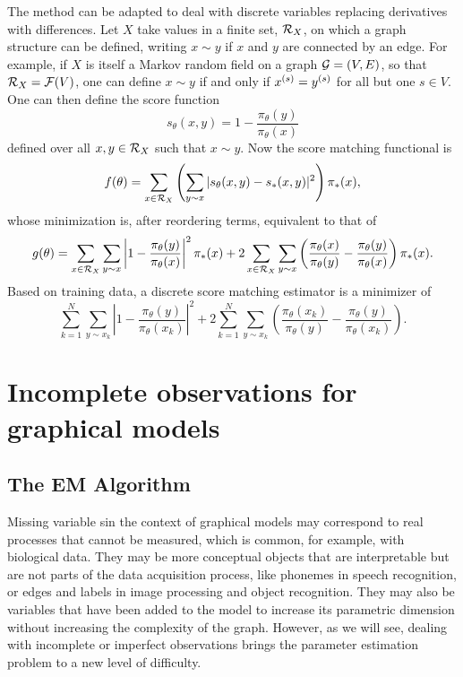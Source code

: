  \begin{remark}
 \label{rem:score.discrete}
The method can be adapted to deal with discrete variables replacing derivatives with differences. Let $X$ take values in a finite set, ${\mathcal R}_X$, on which a graph structure can be defined, writing $x\sim y$ if  $x$ and $y$ are connected by an edge. For example, if $X$ is itself a Markov random field on a graph ${\mathcal G} = (V, E)$, so that ${\mathcal R}_X = {\mathcal F}(V)$, one can define $x\sim y$ if and only if $x^{(s)} = y^{(s)}$ for all but one $s\in V$. One can then define the score function
\[
s_\theta(x, y) = 1 - \frac{\pi_\theta (y)}{\pi_\theta(x)}
\]
defined over all $x, y\in {\mathcal R}_X$ such that $x\sim y$. Now the score matching functional is  
\[
f(\theta) = \sum_{x\in {\mathcal R}_X} \left(\sum_{y\sim x} |s_\theta(x,y) - s_*(x,y)|^2\right) \pi_*(x),
\]
whose minimization is, after reordering terms, equivalent to that of 
\[
g(\theta) = \sum_{x\in {\mathcal R}_X} \sum_{y\sim x} \left| 1 - \frac{\pi_\theta (y)}{\pi_\theta(x)}\right|^2 \pi_*(x) + 2 \sum_{x\in {\mathcal R}_X} \sum_{y\sim x} 
\left( \frac{\pi_\theta(x)}{\pi_\theta(y)} - \frac{\pi_\theta(y)}{\pi_\theta(x)}\right) \pi_*(x).
\]
Based on training data, a discrete score matching estimator is a minimizer of
 \begin{equation}
 \label{eq:scorematch.obj.disc}
\sum_{k=1}^N \sum_{y\sim x_k} \left| 1 - \frac{\pi_\theta (y)}{\pi_\theta(x_k)}\right|^2 + 2 \sum_{k=1}^N \sum_{y\sim x_k} 
\left( \frac{\pi_\theta(x_k)}{\pi_\theta(y)} - \frac{\pi_\theta(y)}{\pi_\theta(x_k)}\right).
\end{equation}

 \end{remark}
 
 






\section{Incomplete observations for graphical models}
\subsection{The EM Algorithm}

 Missing variable sin the context of graphical models may
correspond to real processes that cannot be measured, which is common, for example, with biological data. They may be more conceptual
objects that are interpretable but are not parts of the data
acquisition process, like phonemes in speech recognition, or edges and
labels in image processing and object recognition. They may also be
variables that have been added to the model to increase its parametric
dimension without increasing the complexity of the graph. However, as we will see, dealing with incomplete or imperfect observations  brings the parameter estimation problem to a new level
of difficulty.


